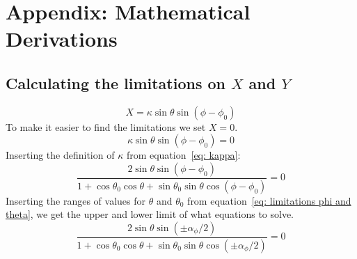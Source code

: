 \documentclass[reprint,english,notitlepage]{revtex4-2}
\begin{document}
\section{Appendix: Mathematical Derivations}
\subsection{Calculating the limitations on $ X $ and $ Y $} \label{ssec: lim x,y}

\[
	X = \kappa  \sin \theta \sin (ϕ - ϕ _0)
\]
To make it easier to find the limitations we set $ X = 0 $. 
\[
\kappa \sin \theta \sin (ϕ - ϕ _0) = 0
\]
Inserting the definition of $ \kappa $ from equation~\ref{eq: kappa}:
\[
	\frac{2 \sin θ \sin (ϕ - ϕ _0)}{1 + \cos \theta _{0}\cos \theta + \sin \theta _{0} \sin \theta \cos (\phi - \phi _{0})} = 0
\]
Inserting the ranges of values for $ \theta $ and $ \theta_0 $ from equation~\ref{eq: limitations phi and theta}, we get the upper and lower limit of what equations to solve.
\[
\frac{2 \sin  θ \sin (\pm α_ϕ / 2)}{1 + \cos θ_0 \cos θ + \sin θ_0 \sin  θ \cos (\pm α_ϕ / 2)} = 0
\]


\newpage
\end{document}
